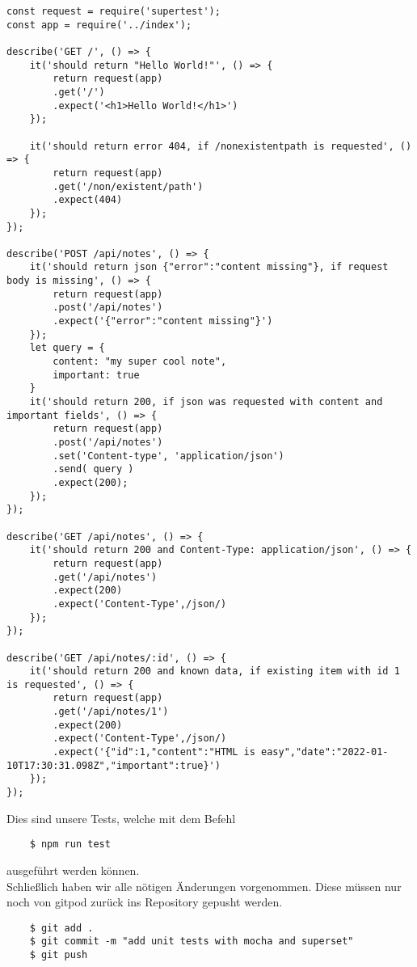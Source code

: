 \begin{verbatim}
const request = require('supertest');
const app = require('../index');

describe('GET /', () => {
	it('should return "Hello World!"', () => {
		return request(app)
		.get('/')
		.expect('<h1>Hello World!</h1>')
	});
	
	it('should return error 404, if /nonexistentpath is requested', () => {
		return request(app)
		.get('/non/existent/path')
		.expect(404)
	});
});

describe('POST /api/notes', () => {
	it('should return json {"error":"content missing"}, if request body is missing', () => {
		return request(app)
		.post('/api/notes')
		.expect('{"error":"content missing"}')
	});
	let query = {
		content: "my super cool note",
		important: true
	}
	it('should return 200, if json was requested with content and important fields', () => {
		return request(app)
		.post('/api/notes')
		.set('Content-type', 'application/json')
		.send( query )
		.expect(200);
	});
});

describe('GET /api/notes', () => {
	it('should return 200 and Content-Type: application/json', () => {
		return request(app)
		.get('/api/notes')
		.expect(200)
		.expect('Content-Type',/json/)
	});
});

describe('GET /api/notes/:id', () => {
	it('should return 200 and known data, if existing item with id 1 is requested', () => {
		return request(app)
		.get('/api/notes/1')
		.expect(200)
		.expect('Content-Type',/json/)
		.expect('{"id":1,"content":"HTML is easy","date":"2022-01-10T17:30:31.098Z","important":true}')
	});
});
\end{verbatim}

\noindent
Dies sind unsere Tests, welche mit dem Befehl

\begin{verbatim}
	$ npm run test
\end{verbatim}

\noindent
ausgeführt werden können. \\

\noindent
Schließlich haben wir alle nötigen Änderungen vorgenommen.
Diese müssen nur noch von gitpod zurück ins Repository gepusht werden.

\begin{verbatim}
	$ git add .
	$ git commit -m "add unit tests with mocha and superset"
	$ git push
\end{verbatim}



